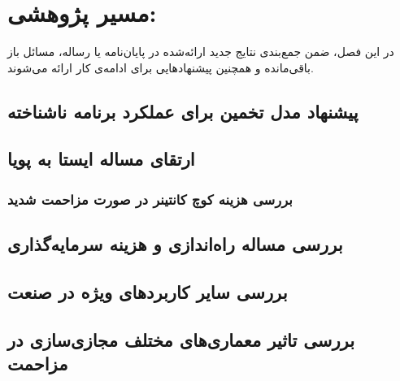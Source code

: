 
\chapter{مسیر پژوهشی:}\label{chap:future}

در این فصل، ضمن جمع‌بندی نتایج جدید ارائه‌شده در پایان‌نامه یا رساله، 
مسائل باز باقی‌مانده و همچنین پیشنهادهایی برای ادامه‌ی کار ارائه می‌شوند.

\section{پیشنهاد مدل تخمین برای عملکرد برنامه ناشناخته}
\section{ارتقای مساله ایستا به پویا}
\subsection{بررسی هزینه کوچ کانتینر در صورت مزاحمت شدید}
\section{بررسی مساله راه‌اندازی و هزینه سرمایه‌گذاری}
\section{بررسی سایر کاربردهای ویژه در صنعت}
\section{بررسی تاثیر معماری‌های مختلف مجازی‌سازی در مزاحمت}
